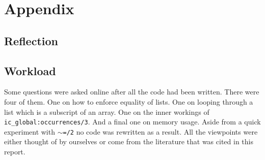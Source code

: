 \section*{Appendix}
\label{sec:appendix}

\subsection*{Reflection}\label{sec:reflection}


\subsection*{Workload}\label{sec:workload}


Some questions were asked online after all the code had been written. There were four of them. One on how to enforce equality of lists. One on looping through a list which is a subscript of an array. One on the inner workings of \texttt{ic\_global:occurrences/3}. And a final one on memory usage. Aside from a quick experiment with \texttt{$\sim$=/2} no code was rewritten as a result. All the viewpoints were either thought of by ourselves or come from the literature that was cited in this report.